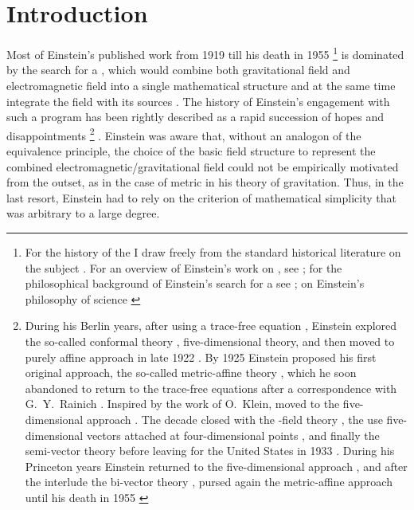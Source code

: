 \documentclass[draft]{article}
\newcommand{\FP}{\german{Fernparallelismus}\xspace}
\begin{document}
\section*{Introduction}
Most of Einstein's published work from 1919 till his death in 1955 \citep{Einstein1955-07}\footnote{For the history of the \uftp I draw freely from the standard historical literature on the subject \cite{Vizgin1994,Goenner2004,Goldstein2003}. For an overview of Einstein's work on \uftp, see \citet{Sauer2014}; for the philosophical background of Einstein's search for a \uft see \citet{Dongen2010}; on Einstein's philosophy of science \citet{Ryckman2017}} is dominated by the search for a \uft, which would combine both gravitational field and electromagnetic field into a single mathematical structure and at the same time integrate the field with its sources \citep{Tonnelat1966}. The history of Einstein's engagement with such a program has been rightly described as a rapid succession of hopes and disappointments \citep[183ff.]{Vizgin1994}\footnote{During his Berlin years, after using a trace-free equation \citep{Einstein1919}, Einstein explored the so-called conformal theory \citep{Einstein1921c},  five-dimensional theory, and then moved to  purely affine approach in late 1922 \citep{Einstein1923c,Einstein1923d,Einstein1923e}. By 1925 Einstein proposed his first original approach, the so-called metric-affine theory \citep{Einstein1925a}, which he soon abandoned to return to the trace-free equations after a correspondence with G.~Y.~Rainich \citep{Einstein1927c}. Inspired by the work of O.~Klein, moved to the five-dimensional approach \citep{Einstein19271,Einstein19272}. The decade closed with the \FP-field theory \citep{Einstein19281,Einstein19282,Einstein1929b,Einstein1930g}, the use five-dimensional vectors attached at four-dimensional points \cite{Einstein1931,Einstein1932}, and finally the semi-vector theory before leaving for the United States in 1933 \citep{Einstein1932c,Einstein1933c,Einstein1934b,Einstein1933d}. During his Princeton years Einstein returned to the five-dimensional approach \citep{Einstein1938a}, and after the interlude the bi-vector theory \citep{Einstein1944a,Einstein1944}, pursed again the metric-affine approach until his death in 1955 \citep{Einstein1945,Einstein1945-04,Einstein1955-07}} \citep[187]{Vizgin1994}. Einstein was aware that, without an analogon of the equivalence principle, the choice of the basic field structure to represent the combined electromagnetic/gravitational field could not be empirically motivated from the outset, as in the case of metric in his theory of gravitation. Thus, in the last resort, Einstein had to rely on the criterion of mathematical simplicity that was arbitrary to a large degree.
\end{document}
